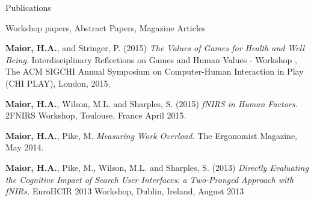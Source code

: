 \documentclass{resume} %
\begin{document}
\begin{rSection}{Publications}
\begin{rSubsection}{ }{ }{ }{Workshop papers, Abstract Papers, Magazine Articles}
    \item \textbf{Maior, H.A.}, and Stringer, P. (2015) \emph{The Values of Games for Health and Well Being}. Interdisciplinary Reflections on Games and Human Values - Workshop , The ACM SIGCHI Annual Symposium on Computer-Human Interaction in Play (CHI PLAY), London, 2015.
    \item \textbf{Maior, H.A.}, Wilson, M.L. and Sharples, S. (2015) \emph{fNIRS in Human Factors.} 2FNIRS Workshop, Toulouse, France April 2015.
    \item \textbf{Maior, H.A.}, Pike, M. \emph{Measuring Work Overload.} The Ergonomist Magazine, May 2014.
    \item \textbf{Maior, H.A.}, Pike, M., Wilson, M.L. and Sharples, S. (2013) \emph{Directly Evaluating the Cognitive Impact of Search User Interfaces: a Two-Pronged Approach with fNIRs.} EuroHCIR 2013 Workshop, Dublin, Ireland, August 2013
\end{rSubsection}

\end{rSection}
\vspace{-2 mm}
\end{document}
